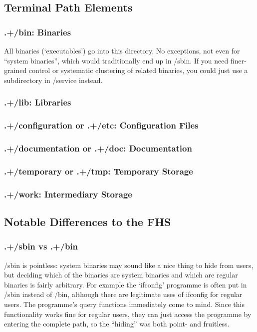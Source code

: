 \documentclass[a4paper,twoside,titlepage]{article}
\begin{document}
\subsection{Terminal Path Elements}

\subsubsection{.+/bin: Binaries}
All binaries (`executables') go into this directory. No exceptions, not even for
``system binaries'', which would traditionally end up in /sbin. If you need
finer-grained control or systematic clustering of related binaries, you could
just use a subdirectory in /service instead.

\subsubsection{.+/lib: Libraries}

\subsubsection{.+/configuration or .+/etc: Configuration Files}

\subsubsection{.+/documentation or .+/doc: Documentation}

\subsubsection{.+/temporary or .+/tmp: Temporary Storage}

\subsubsection{.+/work: Intermediary Storage}

\subsection{Notable Differences to the FHS}

\subsubsection{.+/sbin vs .+/bin}
/sbin is pointless: system binaries may sound like a nice thing to hide from
users, but deciding which of the binaries are system binaries and which are
regular binaries is fairly arbitrary. For example the `ifconfig' programme is
often put in /sbin instead of /bin, although there are legitimate uses of
ifconfig for regular users. The programme's query functions immediately come to
mind. Since this functionality works fine for regular users, they can just
access the programme by entering the complete path, so the ``hiding'' was both
point- and fruitless.
\end{document}
